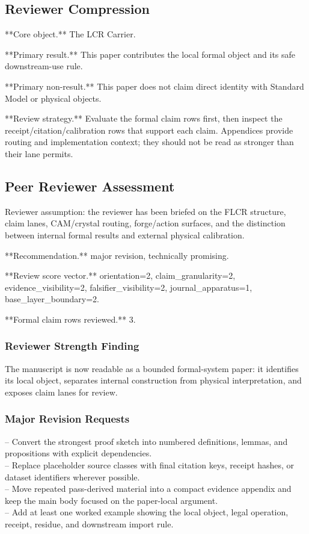 \documentclass[11pt]{article}
\begin{document}
\subsection*{Reviewer Compression}

**Core object.** The LCR Carrier.

**Primary result.** This paper contributes the local formal object and its safe downstream-use rule.

**Primary non-result.** This paper does not claim direct identity with Standard Model or physical objects.

**Review strategy.** Evaluate the formal claim rows first, then inspect the receipt/citation/calibration rows that support each claim. Appendices provide routing and implementation context; they should not be read as stronger than their lane permits.

\subsection*{Peer Reviewer Assessment}

Reviewer assumption: the reviewer has been briefed on the FLCR structure, claim lanes, CAM/crystal routing, forge/action surfaces, and the distinction between internal formal results and external physical calibration.

**Recommendation.** major revision, technically promising.

**Review score vector.** orientation=2, claim\_granularity=2, evidence\_visibility=2, falsifier\_visibility=2, journal\_apparatus=1, base\_layer\_boundary=2.

**Formal claim rows reviewed.** 3.

\subsubsection*{Reviewer Strength Finding}

The manuscript is now readable as a bounded formal-system paper: it identifies its local object, separates internal construction from physical interpretation, and exposes claim lanes for review.

\subsubsection*{Major Revision Requests}

\noindent{}-- Convert the strongest proof sketch into numbered definitions, lemmas, and propositions with explicit dependencies.\\
\noindent{}-- Replace placeholder source classes with final citation keys, receipt hashes, or dataset identifiers wherever possible.\\
\noindent{}-- Move repeated pass-derived material into a compact evidence appendix and keep the main body focused on the paper-local argument.\\
\noindent{}-- Add at least one worked example showing the local object, legal operation, receipt, residue, and downstream import rule.\\
\end{document}
